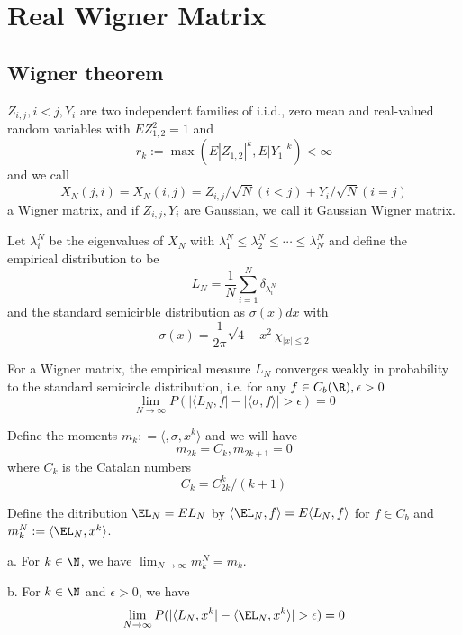 \chapter{Real Wigner Matrix}

\section{Wigner theorem}

\begin{definition}
    $Z_{i,j}, i<j, Y_i$ are two independent families of i.i.d., zero mean and real-valued random variables with $EZ_{1,2}^2 = 1$ and
    \[r_k := \max(E|Z_{1,2}|^k,E|Y_1|^k) < \infty\]
    and we call 
    \[X_N(j,i) = X_N(i,j) = Z_{i,j}/\sqrt{N}(i<j) + Y_i/\sqrt{N}(i=j)\]
    a Wigner matrix, and if $Z_{i,j},Y_i$ are Gaussian, we call it Gaussian Wigner matrix.\par
    Let $\lambda_i^N$ be the eigenvalues of $X_N$ with $\lambda_1^N \leq \lambda_2^N \leq \cdots \leq \lambda_N^N$ and define the empirical distribution to be
    \[L_N = \dfrac{1}{N}\sum\limits_{i=1}^N\delta_{\lambda_i^N}\]
    and the standard semicirble distribution as $\sigma(x)dx$ with
    \[
    \sigma(x) = \dfrac{1}{2\pi}\sqrt{4-x^2}\chi_{|x|\leq 2}
    \]
\end{definition}

\begin{theorem}
    For a Wigner matrix, the empirical measure $L_N$ converges weakly in probability to the standard semicircle distribution, i.e. for any $f\in C_b(\R),\epsilon > 0$
    \[
    \lim_{N\to\infty}P(|\langle L_N,f|-|\langle \sigma,f\rangle| > \epsilon) = 0
    \]
\end{theorem}

\begin{theorem}
    Define the moments $m_k : = \langle ,\sigma,x^k\rangle$ and we will have
    \[m_{2k} = C_k, m_{2k+1} = 0\]
    where $C_k$ is the Catalan numbers
    \[
    C_k = C_{2k}^k/(k+1)
    \]
\end{theorem}

\begin{definition}
    Define the ditribution $\EL_N = EL_N$ by $\langle \EL_N, f\rangle = E\langle L_N,f\rangle$ for $f\in C_b$ and $m_k^N := \langle \EL_N, x^k\rangle $.
\end{definition}

\begin{lemma}
    a. For $k\in \N$, we have $\lim_{N\to\infty} m_k^N = m_k$.\par
    b. For $k\in \N$ and $\epsilon > 0$, we have
    \[\lim_{N\to\infty} P(|\langle L_N, x^k| - \langle \EL_N,x^k\rangle | > \epsilon) = 0\]
\end{lemma}

